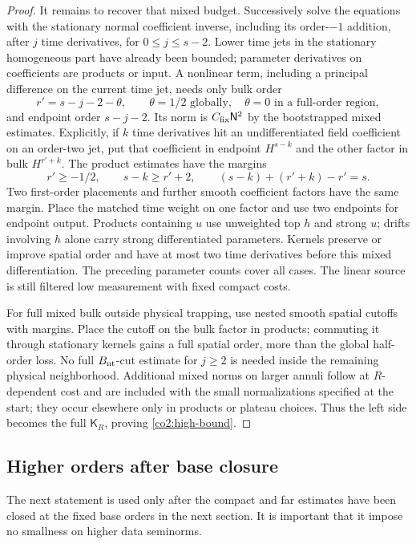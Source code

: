 \begin{proof}
It remains to recover that mixed budget.  Successively solve the equations
with the stationary normal coefficient inverse, including its order-$-1$
addition, after $j$ time derivatives, for $0\le j\le s-2$.
Lower time jets in the stationary homogeneous part have already been bounded;
parameter derivatives on coefficients are products or input.  A nonlinear
term, including a principal difference on the current time jet, needs only
bulk order
\[
 r'=s-j-2-\theta,
 \qquad\theta=1/2\text{ globally},\quad
 \theta=0\text{ in a full-order region},
\]
and endpoint order $s-j-2$.  Its norm is
$C_{\rm fix}\mathsf N^2$ by the bootstrapped mixed estimates.  Explicitly,
if $k$ time derivatives hit an undifferentiated field coefficient on an
order-two jet, put that coefficient in endpoint $H^{s-k}$ and the other
factor in bulk $H^{r'+k}$.  The product estimates have the margins
\[
 r'\ge-1/2,\qquad s-k\ge r'+2,\qquad
 (s-k)+(r'+k)-r'=s.
\]
Two first-order placements and further smooth coefficient factors have the
same margin.  Place the matched time weight on one factor and use two
endpoints for endpoint output.  Products containing $u$ use unweighted top
$h$ and strong $u$; drifts involving $h$ alone carry strong differentiated
parameters.  Kernels preserve or improve spatial order and have at most two
time derivatives before this mixed differentiation.  The preceding parameter
counts cover all cases.  The linear source is still filtered low measurement
with fixed compact costs.

For full mixed bulk outside physical trapping, use nested smooth spatial
cutoffs with margins.  Place the cutoff on the bulk factor in products;
commuting it through stationary kernels gains a full spatial order, more
than the global half-order loss.  No full $B_{\rm nt}$-cut estimate for
$j\ge2$ is needed inside the remaining physical neighborhood.  Additional
mixed norms on larger annuli follow at $R$-dependent cost and are included
with the small normalizations specified at the start; they occur elsewhere
only in products or plateau choices.  Thus the left side becomes the full
$\mathsf K_R$, proving \eqref{co2:high-bound}.
\end{proof}

\subsection{Higher orders after base closure}

The next statement is used only after the compact and far estimates have been
closed at the fixed base orders in the next section.  It is important that
it impose no smallness on higher data seminorms.

